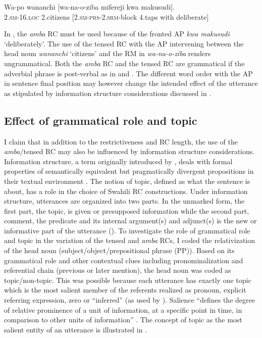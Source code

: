 \documentclass[output=paper,colorlinks,citecolor=brown]{langscibook}
\begin{document}
\ea%
    \label{ex:mwamzandi:24}
    \gll    Wa-po wananchi [wa-na-o-ziba mifereji kwa makusudi].\\
            \textsc{2.sm-16.loc} 2.citizens [\textsc{2.sm-prs-2.srm-}block 4.taps with deliberate]\\
\z

In , the \textit{amba} RC must be used because of the fronted AP \textit{kwa makusudi} ‘deliberately’. The use of the tensed RC with the AP intervening between the head noun \textit{wananchi} ‘citizens’ and the RM in \textit{wa-na-o-ziba} renders  ungrammatical. Both the \textit{amba} RC and the tensed RC are grammatical if the adverbial phrase is post-verbal as in  and . The different word order with the AP in sentence final position may however change the intended effect of the utterance as stipulated by information structure considerations discussed in .

\subsection{Effect of grammatical role and topic}\label{sec:mwamzandi:4.3}

I claim that in addition to the restrictiveness and RC length, the use of the \textit{amba}/tensed RC may also be influenced by information structure considerations. Information structure, a term originally introduced by \citet{Halliday1967}, deals with formal properties of semantically equivalent but pragmatically divergent propositions in their textual environment \citep{Lambrecht1994}. The notion of topic, defined as what the sentence is about, has a role in the choice of Swahili RC constructions. Under information structure, utterances are organized into two parts. In the unmarked form, the first part, the topic, is given or presupposed information while the second part, comment, the predicate and its internal argument(s) and adjunct(s) is the new or informative part of the utterance (\citealt{Prince1981, Prince1992, GundelFretheim2006}). To investigate the role of grammatical role and topic in the variation of the tensed and \textit{amba} RCs, I coded the relativization of the head noun (subject/object/prepositional phrase (PP)). Based on its grammatical role and other contextual clues including pronominalization and referential chain (previous or later mention), the head noun was coded as topic/non-topic. This was possible because each utterance has exactly one topic which is the most salient member of the referents realized as pronoun, explicit referring expression, zero or “inferred” (as used by \citealt{Prince1981}). Salience “defines the degree of relative prominence of a unit of information, at a specific point in time, in comparison to other units of information” \citep{ChiarcosEtAl2011Salience}. The concept of topic as the most salient entity of an utterance is illustrated in .
\end{document}
